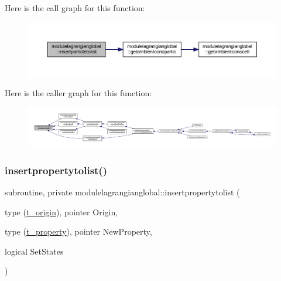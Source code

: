 Here is the call graph for this function\+:\nopagebreak
\begin{figure}[H]
\begin{center}
\leavevmode
\includegraphics[width=350pt]{namespacemodulelagrangianglobal_a2d4644f4134b54b72e810da551bd14a9_cgraph}
\end{center}
\end{figure}
Here is the caller graph for this function\+:\nopagebreak
\begin{figure}[H]
\begin{center}
\leavevmode
\includegraphics[width=350pt]{namespacemodulelagrangianglobal_a2d4644f4134b54b72e810da551bd14a9_icgraph}
\end{center}
\end{figure}
\mbox{\label{namespacemodulelagrangianglobal_ad71ed77715b3249cc24c592dfcca2fc8}} 
\subsubsection{\texorpdfstring{insertpropertytolist()}{insertpropertytolist()}}
{\footnotesize\ttfamily subroutine, private modulelagrangianglobal\+::insertpropertytolist (\begin{DoxyParamCaption}\item[{type (\mbox{\hyperlink{structmodulelagrangianglobal_1_1t__origin}{t\+\_\+origin}}), pointer}]{Origin,  }\item[{type (\mbox{\hyperlink{structmodulelagrangianglobal_1_1t__property}{t\+\_\+property}}), pointer}]{New\+Property,  }\item[{logical}]{Set\+States }\end{DoxyParamCaption})\hspace{0.3cm}{\ttfamily [private]}}

